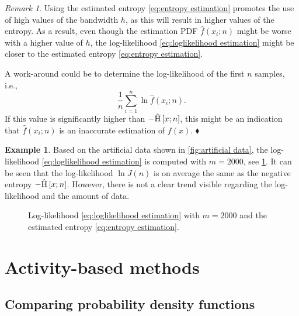 \documentclass[10pt,final,a4paper,oneside,onecolumn]{article}
\newlength\figurewidth
\newlength\figureheight
\newcommand{\hatentropy}[1]{\hat{\textup{H}} \left[ #1 \right]}
\theoremstyle{plain}\newtheorem{definition}{Definition}[section]    %
\theoremstyle{definition}\newtheorem{example}{Example}[section]     %
\theoremstyle{remark}\newtheorem{remarkenv}{Remark}[section]        %
\newenvironment{remark}{\begin{remarkenv}}%
                       {\hfill$\blacklozenge$\end{remarkenv}}       %
\begin{document}
\begin{remark}
	Using the estimated entropy \eqref{eq:entropy estimation} promotes the use of high values of the bandwidth $h$, as this will result in higher values of the entropy. As a result, even though the estimation PDF $\hat{f}(x_i;n)$ might be worse with a higher value of $h$, the log-likelihood \cref{eq:loglikelihood estimation} might be closer to the estimated entropy \eqref{eq:entropy estimation}.
	
	A work-around could be to determine the log-likelihood of the first $n$ samples, i.e.,
	\begin{equation}
		\frac{1}{n} \sum_{i=1}^n \ln \hat{f} (x_i; n).
	\end{equation}
	If this value is significantly higher than $-\hatentropy{x;n}$, this might be an indication that $\hat{f}(x_i; n)$ is an inaccurate estimation of $f(x)$.
\end{remark}

\begin{example} \label{example:likelihood sample based}
	Based on the artificial data shown in \cref{fig:artificial data}, the log-likelihood \eqref{eq:loglikelihood estimation} is computed with $m=2000$, see \cref{fig:likelihood sample based}. It can be seen that the log-likelihood $\ln J(n)$ is on average the same as the negative entropy $-\hatentropy{x;n}$. However, there is not a clear trend visible regarding the log-likelihood and the amount of data.
	
	\setlength{}
	\setlength\figureheight{0.7\figurewidth}
	\begin{figure}
		\centering
		\caption{Log-likelihood \cref{eq:loglikelihood estimation} with $m=2000$ and the estimated entropy \cref{eq:entropy estimation}.}
		\label{fig:likelihood sample based}
	\end{figure}
\end{example}


\section{Activity-based methods}
\label{sec:activity based methods}


\subsection{Comparing probability density functions}
\label{sec:comparing pdf activities}
\end{document}
